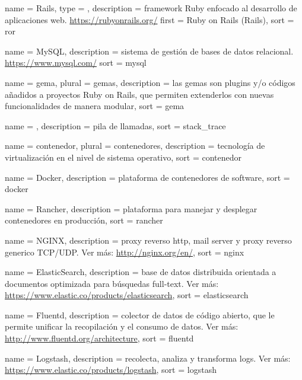 {
  name        = {Rails},
  type        = \acronymtype,
  description =
    {framework Ruby enfocado al desarrollo de aplicaciones web.
    \url{https://rubyonrails.org/}}
  first       = {Ruby on Rails (Rails)},
  sort        = {ror}
}

 {
  name        = {MySQL},
  description =
    {sistema de gestión de bases de datos relacional.
    \url{https://www.mysql.com/}}
  sort        = {mysql}
}

 {
  name        = {gema},
  plural      = {gemas},
  description =
    {las gemas son plugins y/o códigos añadidos a proyectos Ruby on
    Rails, que permiten extenderlos con nuevas funcionalidades de manera
    modular},
  sort        = {gema}
}

 {
  name        = {},
  description = {pila de llamadas},
  sort        = {stack_trace}
}

 {
  name        = {contenedor},
  plural      = {contenedores},
  description = {tecnología de virtualización en el nivel de sistema operativo},
  sort        = {contenedor}
}

 {
  name        = {Docker},
  description = {plataforma de contenedores de software},
  sort        = {docker}
}

 {
  name        = {Rancher},
  description = {plataforma para manejar y desplegar contenedores en producción},
  sort        = {rancher}
}

 {
  name        = {NGINX},
  description =
    {proxy reverso http, mail server y proxy reverso generico TCP/UDP.
    Ver más: \url{http://nginx.org/en/}},
  sort        = {nginx}
}

 {
  name        = {ElasticSearch},
  description =
    {base de datos distribuida orientada a documentos optimizada para búsquedas
    full-text. Ver más: \url{https://www.elastic.co/products/elasticsearch}},
  sort        = {elasticsearch}
}

 {
  name        = {Fluentd},
  description =
    {colector de datos de código abierto, que le permite unificar
    la recopilación y el consumo de datos. Ver más:
    \url{http://www.fluentd.org/architecture}},
  sort        = {fluentd}
}

 {
  name        = {Logstash},
  description =
    {recolecta, analiza y transforma logs. Ver más:
    \url{https://www.elastic.co/products/logstash}},
  sort        = {logstash}
}

